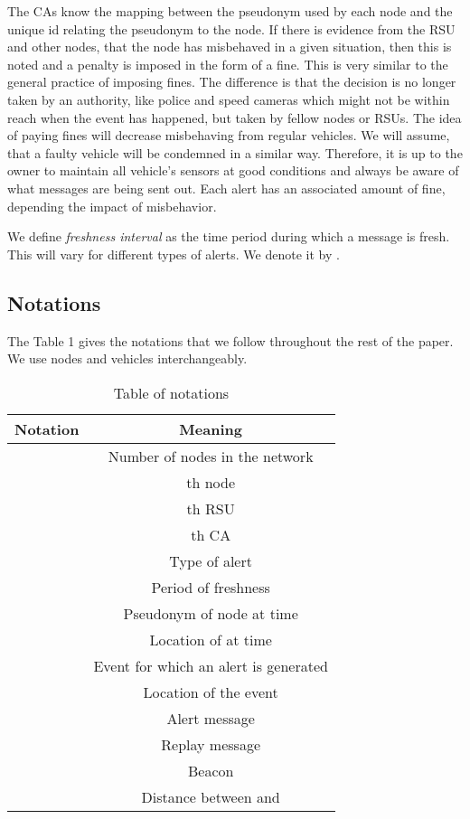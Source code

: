 \documentclass[conference]{IEEEtran}[10pt]
\begin{document}
The CAs know the mapping between the pseudonym  used by each node
and the unique id relating the pseudonym to the node.
If there is evidence from the RSU and other nodes, that the node has misbehaved in a given situation, then this is noted and
a penalty is imposed in the form of a fine. 
This is very similar to the general practice of imposing fines.
The difference is that the decision is no longer taken by an authority, like police and speed cameras which might not be within reach
 when the event has happened, but taken by fellow nodes or RSUs. 
The idea of paying fines  will decrease misbehaving from regular vehicles.
We will assume, that a faulty vehicle will be condemned in a similar way. 
 Therefore, it is up to the owner to maintain  all vehicle's sensors at good conditions and always be aware 
of what messages are being sent out. 
Each alert has an associated  amount of fine, depending the impact of misbehavior. 


We define \emph{freshness interval} as the time period during which a message is fresh.
This will vary for different types of alerts.  
We denote it by . 
 
\subsection{Notations}
The Table 1 gives the notations that we follow throughout the rest of the paper. 
We use nodes and vehicles interchangeably. 


\begin{table}
\begin{center}
\begin{tabular}{|c|c|}
\hline
Notation & Meaning \\
\hline
 & Number of nodes in the network\\
 & th node\\
 & th RSU\\
 & th CA\\
 & Type of alert\\
 & Period of freshness \\
 & Pseudonym of node  at time \\
 & Location of  at time \\
 & Event  for which an alert is generated\\
 & Location of the event \\
 & Alert message\\
 & Replay message\\
 & Beacon\\
 & Distance between  and \\
\hline
\end{tabular}
\end{center}
\label{table:notations}
\caption{Table of notations}
\end{table}
\end{document}
